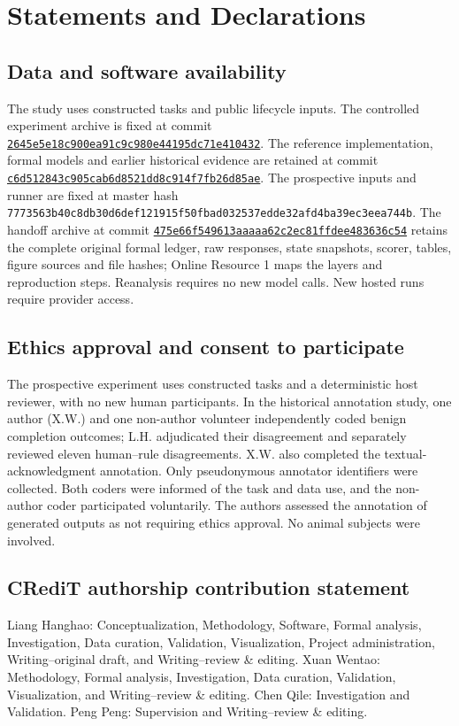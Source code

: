 \documentclass[10pt,a4paper,twocolumn]{article}
\begin{document}
\section*{Statements and Declarations}
\subsection*{Data and software availability}
The study uses constructed tasks and public lifecycle inputs. The controlled experiment archive is fixed at commit \href{https://github.com/lhh666-6/auto-dete/tree/2645e5e18c900ea91c9c980e44195dc71e410432/DKE-supplement}{\nolinkurl{2645e5e18c900ea91c9c980e44195dc71e410432}}. The reference implementation, formal models and earlier historical evidence are retained at commit \href{https://github.com/lhh666-6/auto-dete/tree/c6d512843c905cab6d8521dd8c914f7fb26d85ae/latest}{\nolinkurl{c6d512843c905cab6d8521dd8c914f7fb26d85ae}}. The prospective inputs and runner are fixed at master hash \nolinkurl{7773563b40c8db30d6def121915f50fbad032537edde32afd4ba39ec3eea744b}. The handoff archive at commit \href{https://github.com/lhh666-6/auto-dete/tree/475e66f549613aaaaa62c2ec81ffdee483636c54/cloud-handoff}{\nolinkurl{475e66f549613aaaaa62c2ec81ffdee483636c54}} retains the complete original formal ledger, raw responses, state snapshots, scorer, tables, figure sources and file hashes; Online Resource 1 maps the layers and reproduction steps. Reanalysis requires no new model calls. New hosted runs require provider access.

\subsection*{Ethics approval and consent to participate}
The prospective experiment uses constructed tasks and a deterministic host reviewer, with no new human participants. In the historical annotation study, one author (X.W.) and one non-author volunteer independently coded benign completion outcomes; L.H. adjudicated their disagreement and separately reviewed eleven human--rule disagreements. X.W. also completed the textual-acknowledgment annotation. Only pseudonymous annotator identifiers were collected. Both coders were informed of the task and data use, and the non-author coder participated voluntarily. The authors assessed the annotation of generated outputs as not requiring ethics approval. No animal subjects were involved.

\subsection*{CRediT authorship contribution statement}
Liang Hanghao: Conceptualization, Methodology, Software, Formal analysis, Investigation, Data curation, Validation, Visualization, Project administration, Writing--original draft, and Writing--review \& editing. Xuan Wentao: Methodology, Formal analysis, Investigation, Data curation, Validation, Visualization, and Writing--review \& editing. Chen Qile: Investigation and Validation. Peng Peng: Supervision and Writing--review \& editing.
\end{document}
